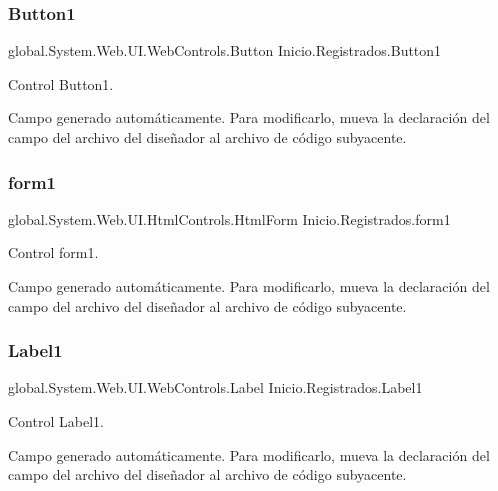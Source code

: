 \subsubsection{\texorpdfstring{Button1}{Button1}}
{\footnotesize\ttfamily global.\+System.\+Web.\+U\+I.\+Web\+Controls.\+Button Inicio.\+Registrados.\+Button1\hspace{0.3cm}{\ttfamily [protected]}}



Control Button1. 

Campo generado automáticamente. Para modificarlo, mueva la declaración del campo del archivo del diseñador al archivo de código subyacente. \mbox{\label{class_inicio_1_1_registrados_a902f9075b41d6386d17242fe32dea6e4}} 
\subsubsection{\texorpdfstring{form1}{form1}}
{\footnotesize\ttfamily global.\+System.\+Web.\+U\+I.\+Html\+Controls.\+Html\+Form Inicio.\+Registrados.\+form1\hspace{0.3cm}{\ttfamily [protected]}}



Control form1. 

Campo generado automáticamente. Para modificarlo, mueva la declaración del campo del archivo del diseñador al archivo de código subyacente. \mbox{\label{class_inicio_1_1_registrados_a89cbfd8509272c14e26ee466a11b7835}} 
\subsubsection{\texorpdfstring{Label1}{Label1}}
{\footnotesize\ttfamily global.\+System.\+Web.\+U\+I.\+Web\+Controls.\+Label Inicio.\+Registrados.\+Label1\hspace{0.3cm}{\ttfamily [protected]}}



Control Label1. 

Campo generado automáticamente. Para modificarlo, mueva la declaración del campo del archivo del diseñador al archivo de código subyacente. \mbox{\label{class_inicio_1_1_registrados_ab7c3cf09be993fe6a07f31881ba27159}} 
